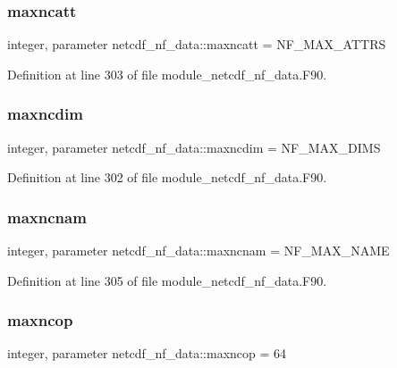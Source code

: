 \subsubsection{\texorpdfstring{maxncatt}{maxncatt}}
{\footnotesize\ttfamily integer, parameter netcdf\+\_\+nf\+\_\+data\+::maxncatt = N\+F\+\_\+\+M\+A\+X\+\_\+\+A\+T\+T\+RS}



Definition at line 303 of file module\+\_\+netcdf\+\_\+nf\+\_\+data.\+F90.

\mbox{\label{namespacenetcdf__nf__data_af99c14cab35f6ca0ee15b37097449c02}} 
\subsubsection{\texorpdfstring{maxncdim}{maxncdim}}
{\footnotesize\ttfamily integer, parameter netcdf\+\_\+nf\+\_\+data\+::maxncdim = N\+F\+\_\+\+M\+A\+X\+\_\+\+D\+I\+MS}



Definition at line 302 of file module\+\_\+netcdf\+\_\+nf\+\_\+data.\+F90.

\mbox{\label{namespacenetcdf__nf__data_adcf62a4007872312900df1fd1fbffaa9}} 
\subsubsection{\texorpdfstring{maxncnam}{maxncnam}}
{\footnotesize\ttfamily integer, parameter netcdf\+\_\+nf\+\_\+data\+::maxncnam = N\+F\+\_\+\+M\+A\+X\+\_\+\+N\+A\+ME}



Definition at line 305 of file module\+\_\+netcdf\+\_\+nf\+\_\+data.\+F90.

\mbox{\label{namespacenetcdf__nf__data_a4095eb49dd5074dec84db1148a92c594}} 
\subsubsection{\texorpdfstring{maxncop}{maxncop}}
{\footnotesize\ttfamily integer, parameter netcdf\+\_\+nf\+\_\+data\+::maxncop = 64}



